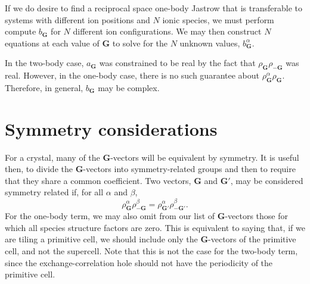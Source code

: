 \documentclass{article}
\newcommand{\vG}{\mathbf{G}}
\begin{document}
If we do desire to find a reciprocal space one-body Jastrow that is
transferable to systems with different ion positions and $N$ 
ionic species, we must perform compute $b_\vG$ for $N$ different ion
configurations.  We may then construct $N$ equations at each value of
$\vG$ to solve for the $N$ unknown values, $b^\alpha_\vG$.

In the two-body case, $a_\vG$ was constrained to be real by the fact
that $\rho_\vG \rho_{-\vG}$ was real.  However, in the one-body case,
there is no such guarantee about $\rho^\alpha_\vG \rho_\vG$.
Therefore, in general, $b_\vG$ may be complex.

\section{Symmetry considerations}
For a crystal, many of the $\vG$-vectors will be equivalent by
symmetry.  It is useful then, to divide the $\vG$-vectors into
symmetry-related groups and then to require that they share a common
coefficient.  Two vectors, $\vG$ and $\vG'$, may be considered
symmetry related if, for all $\alpha$ and $\beta$,
\begin{equation}
\rho^\alpha_\vG \rho^\beta_{-\vG} = \rho^\alpha_{\vG'} \rho^\beta_{-\vG'}. 
\end{equation}
For the one-body term, we may also omit from our list of $\vG$-vectors
those for which all species structure factors are zero.  This is
equivalent to saying that, if we are tiling a primitive cell, we
should include only the $\vG$-vectors of the primitive cell, and not
the supercell.  Note that this is not the case for the two-body term,
since the exchange-correlation hole should not have the periodicity of
the primitive cell.
\end{document}
